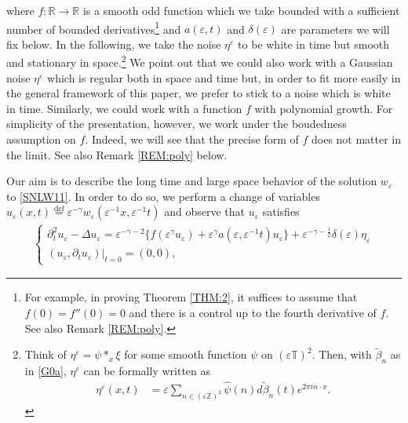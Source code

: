 \documentclass[letterpaper, 11pt,  reqno]{amsart}
\newcommand{\1}{\hspace{0.5mm}\text{I}\hspace{0.5mm}}
\newcommand{\noi}{\noindent}
\newcommand{\Z}{\mathbb{Z}}
\newcommand{\T}{\mathbb{T}}
\newcommand{\be}{\beta}
\newcommand{\Dl}{\Delta}
\newcommand{\eps}{\varepsilon}
\newcommand{\g}{\gamma}
\newcommand{\ft}{\widehat}
\newcommand{\wt}{\widetilde}
\newcommand{\dt}{\partial_t}
\numberwithin{equation}{section}
\numberwithin{theorem}{section}
\begin{document}
\noi
where 
 $f : \mathbb{R} \rightarrow
\mathbb{R}$ is a  smooth odd function which we take bounded with a sufficient
number of bounded derivatives\footnote{For example, in proving  Theorem \ref{THM:2}, 
it suffices to assume that $f(0) = f''(0) = 0$
and there is a control up to the fourth derivative of $f$.
See also Remark \ref{REM:poly}.} 
and $a (\eps, t)$ and $\delta(\eps)$ are parameters we will fix below.
In the following, we take  the noise $\eta^\eps$ to be white in time but
smooth and stationary in space.\footnote{
Think of $\eta^\eps = \psi *_x \xi$ for some smooth function $\psi$ on $(\eps\T)^2$.
Then, 
with $\wt \beta_n$ as in \eqref{G0a}, 
$\eta^\eps$ can be formally written  as 
\begin{align}
\eta^\eps(x, t) & 
=  \eps \sum_{n\in (\eps \Z)^{2}}
\ft \psi(n) d \wt \be_n (t) e^{2\pi i  n\cdot x} .
\label{MG0a}
\end{align}

}
 We point out that we could also work  with a Gaussian noise
$\eta^\eps$ which is regular both in space and time but, in order to fit more easily
in the general framework of this paper, we prefer to stick to a noise which is
white in time. 
Similarly,  we could work with a function $f$ with polynomial
growth.
For simplicity of the presentation, however, 
we work under the boudedness assumption on $f$.
 Indeed,  we will see that the precise form of $f$ does not matter in
the limit. 
See also Remark \ref{REM:poly} below.


Our aim is to describe the long time and large space behavior of
the solution $w_\eps$ to \eqref{SNLW11}.
 In order to do so,  we perform a change of variables
$u_{\eps} (x, t) \overset{\text{def}}{=} \eps^{- \g} w_\eps (\eps^{-1} x, \eps^{-1} t)$ 
and observe that $u_{\eps}$ satisfies
\begin{align}
\begin{cases}
 \dt^2 u_\eps - \Dl u_\eps
  = \eps^{- \gamma - 2} \big\{f
(\eps^{\gamma} u_{\eps}) + \eps^{\gamma} a
(\eps, \eps^{-1} t) u_{\eps}\big\} + \eps^{ - \g-\frac 12 } \delta
(\eps) \eta_{\eps}\\
(u_\eps, \dt u_\eps) |_{t = 0} = (0, 0),
\end{cases}
\label{SNLW12}
\end{align}
\end{document}
